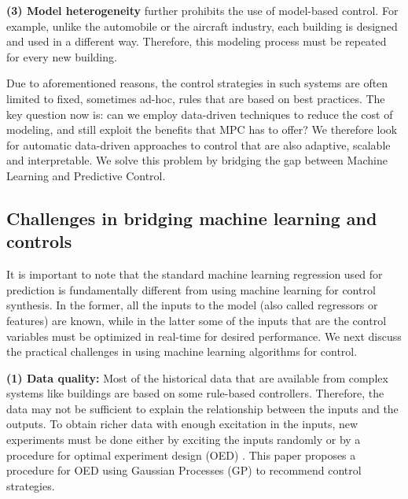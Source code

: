 \noindent \textbf{(3) Model heterogeneity} further prohibits the use of model-based control. For example, unlike the automobile or the aircraft industry, each building is designed and used in a different way. Therefore, this modeling process must be repeated for every new building. 

Due to aforementioned reasons, the control strategies in such systems are often limited to fixed, sometimes ad-hoc, rules that are based on best practices. The key question now is: can we employ data-driven techniques to reduce the cost of modeling, and still exploit the benefits that MPC has to offer?
We therefore look for automatic data-driven approaches to control that are also adaptive, scalable and interpretable.
We solve this problem by bridging the gap between Machine Learning and Predictive Control.

\subsection{Challenges in bridging machine learning and controls}
\label{SS:practical_challenges}


It is important to note that the standard machine learning regression used for prediction is fundamentally different from using machine learning for control synthesis. In the former, all the inputs to the model (also called regressors or features) are known, while in the latter some of the inputs that are the control variables must be optimized in real-time for desired performance. 
We next discuss the practical challenges in using machine learning algorithms for control.

\noindent \textbf{(1) Data quality:} Most of the historical data that are available from complex systems like buildings are based on some rule-based controllers. 
Therefore, the data may not be sufficient to explain the relationship between the inputs and the outputs. 
To obtain richer data with enough excitation in the inputs, new experiments must be done either by exciting the inputs randomly or by a procedure for optimal experiment design (OED) \cite{Emery1998,Fedorov2010}. 
This paper proposes a procedure for OED using Gaussian Processes (GP) to recommend control strategies.

